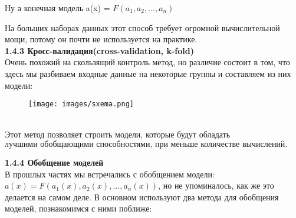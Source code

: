 Ну а конечная модель a(x) = \(F(a_1, a_2, ..., a_n)\) \\
\vspace{0.3cm}

На больших наборах данных этот способ требует огромной вычислительной мощи,
потому он почти не используется на практике. \\
\vspace{0.5cm}
\textbf{1.4.3 Кросс-валидация(cross-validation, k-fold)} \\
\vspace{0.5cm}
Очень похожий на скользящий контроль метод, но различие состоит в том, что здесь мы разбиваем входные данные
на некоторые группы и составляем из них модели: \\
\begin{figure}[htbp]
        \centering
        \texttt{[image: images/sxema.png]}
        \label{fig:example}
\end{figure} \\
Этот метод позволяет строить модели, которые будут обладать \(\textbf{лучшими обобщающими способностями,
при меньше количестве вычислений.}\)

\vspace{0.5cm}
\textbf{1.4.4 Обобщение моделей} \\
\vspace{0.5cm}
В прошлых частях мы встречались с обобщением модели: \(a(x) = F(a_1(x), a_2(x), ... , a_n(x))\), но не упоминалось,
как же это делается на самом деле.
В основном используют два метода для обобщения моделей, познакомимся с ними поближе: \\
\vspace{0.5cm}

